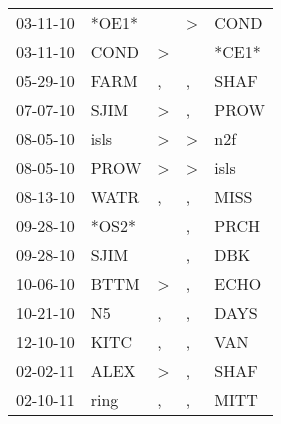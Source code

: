 \begin{supertabular}{p{0.07\textwidth}p{0.06\textwidth}p{0.02\textwidth}p{0.02\textwidth}p{0.06\textwidth}}
          03-11-10\textsuperscript{} &                            *OE1* &                  &     \textgreater &           COND\textsuperscript{} \\
          03-11-10\textsuperscript{} &           COND\textsuperscript{} &     \textgreater &                  &                            *CE1* \\
          05-29-10\textsuperscript{} &           FARM\textsuperscript{} &                , &                , &           SHAF\textsuperscript{} \\
          07-07-10\textsuperscript{} &           SJIM\textsuperscript{} &     \textgreater &                , &           PROW\textsuperscript{} \\
          08-05-10\textsuperscript{} &           isls\textsuperscript{} &     \textgreater &     \textgreater &            n2f\textsuperscript{} \\
          08-05-10\textsuperscript{} &           PROW\textsuperscript{} &     \textgreater &     \textgreater &           isls\textsuperscript{} \\
          08-13-10\textsuperscript{} &           WATR\textsuperscript{} &                , &                , &           MISS\textsuperscript{} \\
          09-28-10\textsuperscript{} &                            *OS2* &                  &                , &           PRCH\textsuperscript{} \\
          09-28-10\textsuperscript{} &           SJIM\textsuperscript{} &                  &                , &            DBK\textsuperscript{} \\
          10-06-10\textsuperscript{} &           BTTM\textsuperscript{} &     \textgreater &                , &           ECHO\textsuperscript{} \\
          10-21-10\textsuperscript{} &             N5\textsuperscript{} &                , &                , &           DAYS\textsuperscript{} \\
          12-10-10\textsuperscript{} &           KITC\textsuperscript{} &                , &                , &            VAN\textsuperscript{} \\
          02-02-11\textsuperscript{} &           ALEX\textsuperscript{} &     \textgreater &                , &           SHAF\textsuperscript{} \\
          02-10-11\textsuperscript{} &           ring\textsuperscript{} &                , &                , &           MITT\textsuperscript{} \\

\end{supertabular}
